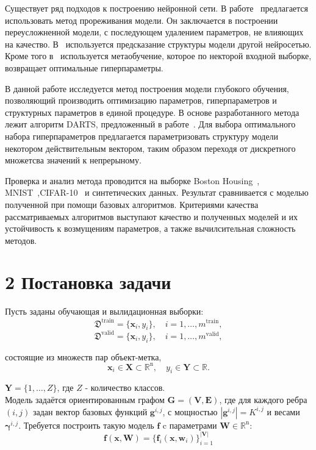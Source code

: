 \documentclass[12pt,twoside]{article}
\begin{document}
Существует ряд подходов к построению нейронной сети. В работе~\cite{BrainDamage} предлагается использовать метод прореживания модели. Он заключается в построении переусложненной модели, с последующем удалением параметров, не влияющих на качество. В~\cite{EASNT} используется предсказание структуры модели другой нейросетью. Кроме того в~\cite{GO} используется метаобучение, которое по некторой входной выборке, возвращает оптимальные гиперпараметры.

В данной работе исследуется метод построения модели глубокого обучения, позволяющий производить оптимизацию параметров, гиперпараметров и структурных параметров в единой процедуре. В основе разработанного метода лежит алгоритм DARTS, предложенный в работе~\cite{DARTS}. Для выбора оптимального набора гиперпараметров предлагается  параметризовать структуру
модели некотором действительным вектором, таким образом переходя от дискретного множетсва значений к непрерыному.

Проверка и анализ метода проводится на выборке Boston Housing~\cite{Boston}, MNIST~\cite{MNIST},CIFAR-10~\cite{CIFAR-10} и синтетических данных. Результат сравнивается с моделью полученной при помощи базовых алгоритмов. Критериями качества рассматриваемых алгоритмов выступают качество и полученных моделей и их устойчивость к возмущениям параметров, а также вычилсительная сложность методов.

\section{2 Постановка задачи}
Пусть заданы обучающая и вылидационная выборки:
\[
\mathfrak{D}^{\text{train}} = \{\mathbf{x}_i, y_i\}, \quad i=1,\dots,m^{\text{train}},
\]
\[
\mathfrak{D}^{\text{valid}} = \{\mathbf{x}_i, y_i\}, \quad i=1,\dots,m^{\text{valid}},
\]

состоящие из множеств пар объект-метка,
\[
\mathbf{x}_i\in\mathbf{X}\subset\mathbb{R}^{\text{n}},\quad y_i\in\mathbf{Y}\subset\mathbb{R}.
\] 

$\mathbf{Y}= \{1,\dots,Z\}$, где $Z$ - количество классов.
\\

Модель задаётся ориентированным графом $\mathbf{G=(V,E)}$, где для каждого ребра $(i,j)$ задан вектор базовых функций $\mathbf{g}^{i,j}$, с мощностью $|\mathbf{g}^{i,j}| = K^{i,j}$ и весами $\boldsymbol{\gamma}^{i,j}$. Требуется построить такую модель $\mathbf{f}$ c параметрами $\mathbf{W}\in\mathbb{R}^\text{n}$:
\[
\mathbf{f}(\mathbf{x}, \mathbf{W})= \{ \mathbf{f}_i(\mathbf{x}, \mathbf{w}_i)\}_{i=1}^\mathbf{|V|}
\]
\end{document}
